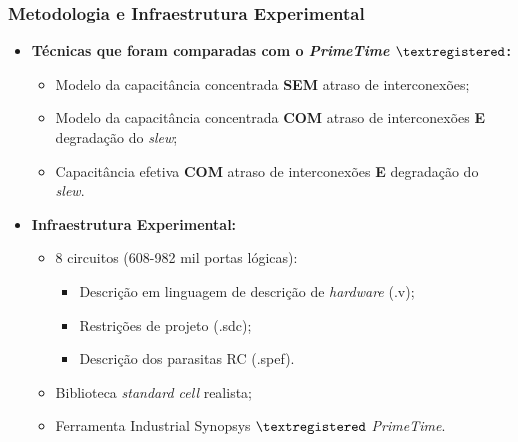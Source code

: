 \documentclass[10pt,a4paper]{beamer}
\begin{document}
		\begin{frame}[t]
			\frametitle{Metodologia e Infraestrutura Experimental}
			\begin{center}
				\begin{itemize}
					\item \textbf{Técnicas que foram comparadas com o \textit{PrimeTime} $\textregistered$:}	\\
						\begin{itemize}
							\item Modelo da capacitância concentrada \textbf{SEM} atraso de interconexões;
							\item Modelo da capacitância concentrada \textbf{COM} atraso de interconexões \textbf{E} degradação do \textit{slew};
							\item Capacitância efetiva \textbf{COM} atraso de interconexões \textbf{E} degradação do \textit{slew}.
						\end{itemize} \pause
					\item \textbf{Infraestrutura Experimental: } \\
						\begin{itemize}
						\item 8 circuitos (608-982 mil portas lógicas): \\
						\begin{itemize}
							\item Descrição em linguagem de descrição de \textit{hardware} (.v); \\
							\item Restrições de projeto (.sdc);\\
							\item Descrição dos parasitas RC (.spef).
						\end{itemize}
						\item Biblioteca \textit{standard cell} realista; \\
						\item Ferramenta Industrial Synopsys $\textregistered$ \textit{PrimeTime}.
					\end{itemize} 
				\end{itemize}
				
			\end{center}
		\end{frame}			
		
\end{document}
